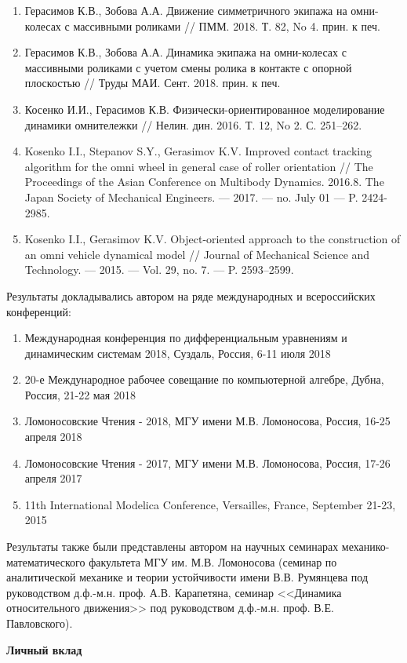 \begin{enumerate}
	\item Герасимов К.В., Зобова А.А. Движение симметричного экипажа на омни-колесах с массивными роликами // ПММ. 2018. Т. 82, No 4. прин. к печ.	\item Герасимов К.В., Зобова А.А. Динамика экипажа на омни-колесах с массивными роликами с учетом смены ролика в контакте с опорной плоскостью // Труды МАИ. Сент. 2018. прин. к печ.	\item Косенко И.И., Герасимов К.В. Физически-ориентированное моделирование динамики омнитележки // Нелин. дин. 2016. Т. 12, No 2. С. 251–262.	\item Kosenko I.I., Stepanov S.Y., Gerasimov K.V. Improved contact tracking algorithm for the omni wheel in general case of roller orientation // The Proceedings of the Asian Conference on Multibody Dynamics. 2016.8. The Japan Society of Mechanical Engineers. — 2017. — no. July 01 — P. 2424-2985.	\item Kosenko I.I., Gerasimov K.V. Object-oriented approach to the construction of an omni vehicle dynamical model // Journal of Mechanical Science and Technology. — 2015. — Vol. 29, no. 7. — P. 2593–2599.\end{enumerate}Результаты докладывались автором на ряде международных и всероссийских конференций:\begin{enumerate}
	\item Международная конференция по дифференциальным уравнениям и динамическим системам 2018, Суздаль, Россия, 6-11 июля 2018
	\item 20-е Международное рабочее совещание по компьютерной алгебре, Дубна, Россия, 21-22 мая 2018	\item Ломоносовские Чтения - 2018, МГУ имени М.В. Ломоносова, Россия, 16-25 апреля 2018	\item Ломоносовские Чтения - 2017, МГУ имени М.В. Ломоносова, Россия, 17-26 апреля 2017	\item 11th International Modelica Conference, Versailles, France, September 21-23, 2015\end{enumerate}
Результаты также были представлены автором на научных семинарах ме\-ха\-ни\-ко-математического факультета МГУ им. М.В. Ломоносова (семинар по аналитической механике и теории устойчивости имени В.В. Румянцева под руководством д.ф.-м.н. проф. А.В. Карапетяна, семинар <<Динамика относительного движения>> под руководством д.ф.-м.н. проф. В.Е. Павловского).

\textbf{Личный вклад}

